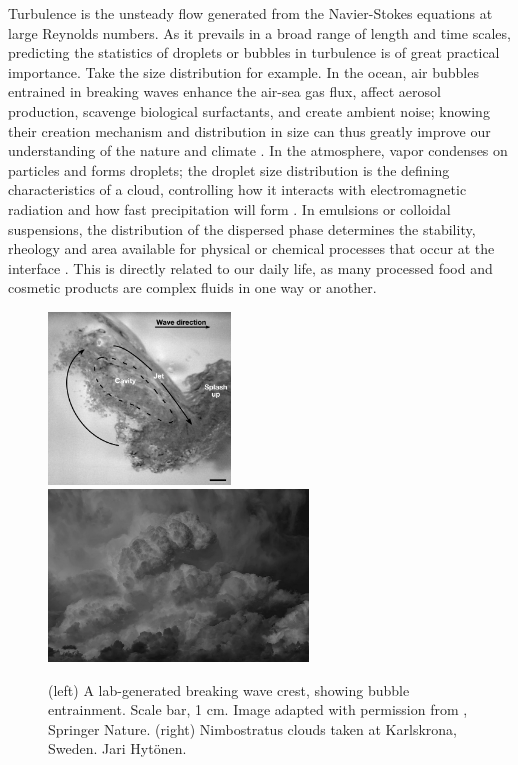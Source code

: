 Turbulence is the unsteady flow generated from the Navier-Stokes equations at large Reynolds numbers.
As it prevails in a broad range of length and time scales, predicting the statistics of droplets or bubbles in turbulence is of great practical importance.
Take the size distribution for example.
In the ocean, air bubbles entrained in breaking waves enhance the air-sea gas flux, affect aerosol production, scavenge biological surfactants, and create ambient noise; knowing their creation mechanism and distribution in size can thus greatly improve our understanding of the nature and climate \citep{deane_stokes_2002a}.
In the atmosphere, vapor condenses on particles and forms droplets; the droplet size distribution is the defining characteristics of a cloud, controlling how it interacts with electromagnetic radiation and how fast precipitation will form \citep{Shaw_2003}.
In emulsions or colloidal suspensions, the distribution of the dispersed phase determines the stability, rheology and area available for physical or chemical processes that occur at the interface \citep{boxall_etal_2012}. This is directly related to our daily life, as many processed food and cosmetic products are complex fluids in one way or another.

\begin{figure}%
  \centering
  \includegraphics[height=4.57cm]{ocean_wave.png}
  \includegraphics[height=4.57cm]{nimbus_cloud.png}
  \caption{(left) A lab-generated breaking wave crest, showing bubble entrainment. Scale bar, 1 cm. Image adapted with permission from \cite{deane_stokes_2002a}, \textcopyright \enspace Springer Nature. (right) Nimbostratus clouds taken at Karlskrona, Sweden. \textcopyright \enspace Jari Hyt\"onen.}
  \label{fig:wave-cloud}
\end{figure}

